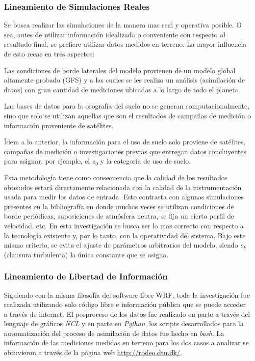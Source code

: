 \subsubsection{Lineamiento de Simulaciones Reales}
Se busca realizar las simulaciones de la manera mas real y operativa posible. O sea, antes de utilizar información idealizada o conveniente con respecto al resultado final, se prefiere utilizar datos medidos en terreno. La mayor influencia de esto recae en tres aspectos:
\begin{enumerate*}
	\item Las condiciones de borde laterales del modelo provienen de un modelo global altamente probado (GFS) y a las cuales se les realiza un análisis (asimilación de datos) con  gran cantidad de mediciones ubicadas a lo largo de todo el planeta.
	\item Las bases de datos para la orografía del suelo no se generan computacionalmente, sino que solo se utilizan aquellas que son el resultados de campañas de medición o información proveniente de satélites.
	\item Ídem a lo anterior, la información para el uso de suelo solo proviene de satélites, campañas de medición o investigaciones previas que entregan datos concluyentes para asignar, por ejemplo, el $z_0$ y la categoría de uso de suelo.
\end{enumerate*}
Esta metodología tiene como consecuencia que la calidad de los resultados obtenidos estará directamente relacionada con la calidad de la instrumentación usada para medir los datos de entrada. Esto contrasta con algunas simulaciones presentes en la bibliografía en donde muchas veces se utilizan condiciones de borde periódicas, suposiciones de atmósfera neutra, se fija un cierto perfil de velocidad, etc. En esta investigación se busca ser lo mas correcto con respecto a la tecnología existente y, por lo tanto, con la operatividad del sistema. Bajo este mismo criterio, se evita el ajuste de parámetros arbitrarios del modelo, siendo $c_k$ (clausura turbulenta) la única constante que se asigna.
\subsubsection{Lineamiento de Libertad de Información}
Siguiendo con la misma filosofía del software libre WRF, toda la investigación fue realizada utilizando solo código libre e información pública que se puede acceder a través de internet. El posproceso de los datos fue realizado en parte a través del lenguaje de gráficos \emph{NCL} y en parte en \emph{Python}, los scripts desarrollados para la automatización del proceso de asimilación de datos fue hecho en \emph{bash}. La información de las mediciones medidas en terreno para los dos casos a analizar se obtuvieron a través de la página web \url{http://rodeo.dtu.dk/}.
